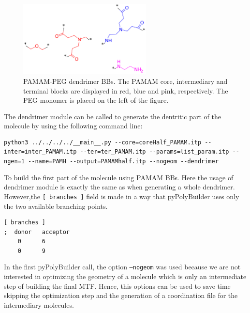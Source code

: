 \begin{figure}
    \centering
    \includegraphics[width=0.6\textwidth]{PAMAM_PEG/PAMAMPEGBBs.png}
    \caption{PAMAM-PEG dendrimer BBs. The PAMAM core, intermediary and terminal blocks are displayed in red, blue and pink, respectively. The PEG monomer is placed on the left of the figure.}
    \label{fig:PAMAMPEGBBs}
\end{figure}

The dendrimer module can be called to generate the dentritic part of the molecule by using the following command line:

\begin{lstlisting}
python3 ../../../../__main__.py --core=coreHalf_PAMAM.itp --inter=inter_PAMAM.itp --ter=ter_PAMAM.itp --params=list_param.itp --ngen=1 --name=PAMH --output=PAMAMhalf.itp --nogeom --dendrimer
\end{lstlisting}

To build the first part of the molecule using PAMAM BBs.
Here the usage of dendrimer module is exactly the same as when generating a whole dendrimer.
However,the \texttt{[ branches ]} field is made in a way that pyPolyBuilder uses only the two available branching points.

\begin{lstlisting}
[ branches ]
;  donor   acceptor
    0      6
    0      9
\end{lstlisting}

In the first pyPolyBuilder call, the option \texttt{--nogeom} was used because we are not interested in optimizing the geometry of a molecule which is only an intermediate step of building the final MTF.
Hence, this options can be used to save time skipping the optimization step and the generation of a coordination file for the intermediary molecules.

